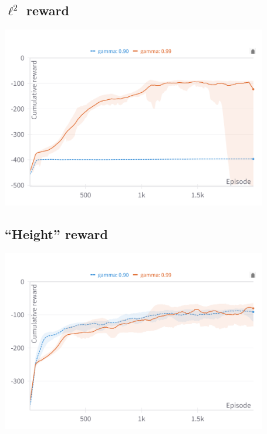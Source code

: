 \documentclass[
  letterpaper,
  DIV=11,
  numbers=noendperiod,
  oneside]{scrartcl}
\begin{document}
\subsection{\texorpdfstring{\(\ell^2\)
reward}{\textbackslash ell\^{}2 reward}}\label{ell2-reward}

\begin{center}
\includegraphics[width=\textwidth,height=3.125in]{figs/reward_l2.png}
\end{center}


\subsection{``Height'' reward}\label{height-reward}

\begin{center}
\includegraphics[width=\textwidth,height=3.125in]{figs/reward_height.png}
\end{center}
\end{document}
